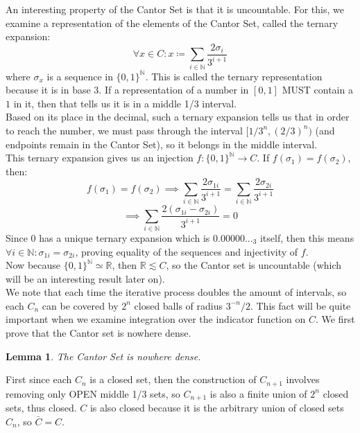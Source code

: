 \documentclass{exam}
\newtheorem{lem}{Lemma}[section]
\begin{document}
An interesting property of the Cantor Set is that it is uncountable. For this, we examine a representation of the elements of the Cantor Set, called the ternary expansion:
\begin{equation*}
  \forall x \in C: x \coloneq \sum_{i \in \mathbb{N}} \frac{2\sigma_i}{3^{i+1}}
\end{equation*}
where $\sigma_x$ is a sequence in $\{0, 1\}^\mathbb{N}$. This is called the ternary representation because it is in base 3. If a representation of a number in $[0, 1]$ MUST contain a $1$ in it, then that tells us it is in a middle 1/3 interval.\\

Based on its place in the decimal, such a ternary expansion tells us that in order to reach the number, we must pass through the interval $[1/3^n, (2/3)^n)$ (and endpoints remain in the Cantor Set), so it belongs in the middle interval.\\

This ternary expansion gives us an injection $f: \{0, 1\}^\mathbb{N} \xrightarrow{} C$. If $f(\sigma_1) = f(\sigma_2)$, then:
\begin{equation*}
  f(\sigma_1) = f(\sigma_2) \implies \sum_{i \in \mathbb{N}}\frac{2\sigma_{1i}}{3^{i+1}} = \sum_{i \in \mathbb{N}}\frac{2\sigma_{2i}}{3^{i+1}}
\end{equation*}
\begin{equation*}
  \implies \sum_{i \in \mathbb{N}}\frac{2(\sigma_{1i} - \sigma_{2i})}{3^{i+1}} = 0
\end{equation*}
Since $0$ has a unique ternary expansion which is $0.00000..._3$ itself, then this means $\forall i \in \mathbb{N}: \sigma_{1i} = \sigma_{2i}$, proving equality of the sequences and injectivity of $f$.\\

Now because $\{0, 1\}^\mathbb{N} \simeq \mathbb{R}$, then $\mathbb{R} \lesssim C$, so the Cantor set is uncountable (which will be an interesting result later on).\\

We note that each time the iterative process doubles the amount of intervals, so each $C_n$ can be covered by $2^n$ closed balls of radius $3^{-n}/2$. This fact will be quite important when we examine integration over the indicator function on $C$. We first prove that the Cantor set is nowhere dense. 
\begin{lem}
The Cantor Set is nowhere dense.
\end{lem}
First since each $C_n$ is a closed set, then the construction of $C_{n+1}$ involves removing only OPEN middle 1/3 sets, so $C_{n+1}$ is also a finite union of $2^n$ closed sets, thus closed. $C$ is also closed because it is the arbitrary union of closed sets $C_n$, so $\bar{C} = C$.\\
\end{document}
